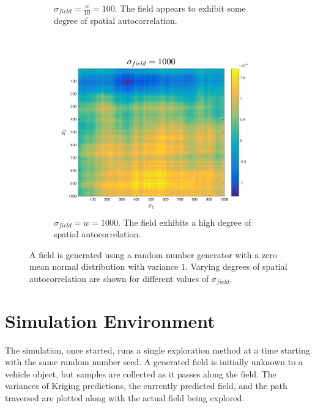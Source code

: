\begin{figure}[ht!]
\begin{subfigure}[t]{0.33333\textwidth}
        \caption{$\sigma_{field} = \frac{w}{10} = 100$. The field appears to exhibit some degree of spatial autocorrelation.}
    \end{subfigure}%
    ~ 
    \begin{subfigure}[t]{0.33333\textwidth}
        \centering
        \includegraphics[width=\linewidth]{figures/autocorr_sigma_1000.png}
		\captionsetup{skip=0.25\baselineskip,size=footnotesize}
		\ssp
        \caption{$\sigma_{field} = w = 1000$. The field exhibits a high degree of spatial autocorrelation.}
    \end{subfigure}
    \ssp
    \caption{A field is generated using a random number generator with a zero mean normal distribution with variance $1$. Varying degrees of spatial autocorrelation are shown for different values of $\sigma_{field}$.}
\end{figure}

\section{Simulation Environment}
The simulation, once started, runs a single exploration method at a time starting with the same random number seed. A generated field is initially unknown to a vehicle object, but samples are collected as it passes along the field. The variances of Kriging predictions, the currently predicted field, and the path traversed are plotted along with the actual field being explored.


